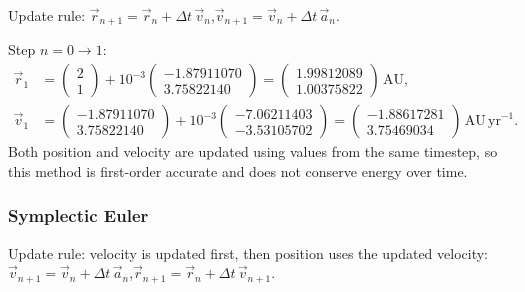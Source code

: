 Update rule: $\vec{r}_{n+1} = \vec{r}_n + \Delta t\,\vec{v}_n$,\quad $\vec{v}_{n+1} = \vec{v}_n + \Delta t\,\vec{a}_n$.

Step $n = 0 \to 1$:
\begin{align*}
    \vec{r}_1 &= \begin{pmatrix}2\\1\end{pmatrix}
    + 10^{-3}\begin{pmatrix}-1.87911070\\3.75822140\end{pmatrix}
    = \begin{pmatrix}1.99812089\\1.00375822\end{pmatrix}\,\mathrm{AU},\\
    \vec{v}_1 &= \begin{pmatrix}-1.87911070\\3.75822140\end{pmatrix}
    + 10^{-3}\begin{pmatrix}-7.06211403\\-3.53105702\end{pmatrix}
    = \begin{pmatrix}-1.88617281\\3.75469034\end{pmatrix}\,\mathrm{AU\,yr}^{-1}.
\end{align*}
Both position and velocity are updated using values from the same timestep, so this method is first-order
accurate and does not conserve energy over time.

\subsubsection*{Symplectic Euler}

Update rule: velocity is updated first, then position uses the updated velocity:
$\vec{v}_{n+1} = \vec{v}_n + \Delta t\,\vec{a}_n$,\quad $\vec{r}_{n+1} = \vec{r}_n + \Delta t\,\vec{v}_{n+1}$.

